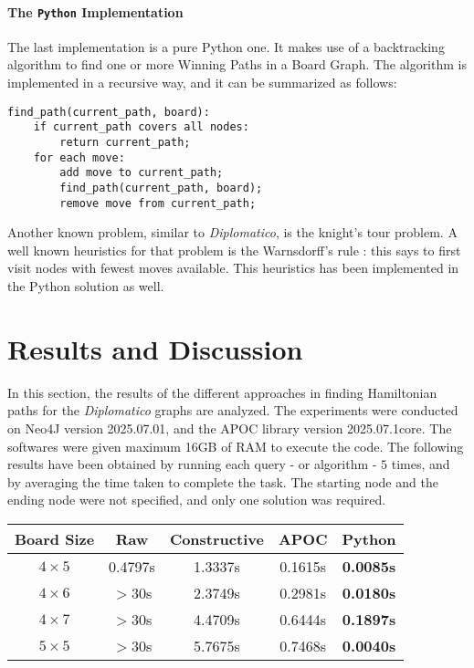 \documentclass[conference]{IEEEtran}
\begin{document}
\paragraph{The \texttt{Python} Implementation}
The last implementation is a pure Python one. It makes use of a backtracking algorithm to find one or more Winning Paths in a Board Graph.
The algorithm is implemented in a recursive way, and it can be summarized as follows:
\begin{tcolorbox}[colback=yellow!5!white, colframe=yellow!50!black]
\begin{verbatim}
find_path(current_path, board):
    if current_path covers all nodes:
        return current_path;
    for each move:
        add move to current_path;
        find_path(current_path, board);
        remove move from current_path;
\end{verbatim}
\end{tcolorbox}

Another known problem, similar to \textit{Diplomatico}, is the knight's tour problem.
A well known heuristics for that problem is the Warnsdorff's rule \cite{warnsdorff}: this says to first visit nodes with fewest moves available.
This heuristics has been implemented in the Python solution as well.

\section{Results and Discussion}

In this section, the results of the different approaches in finding Hamiltonian paths for the \textit{Diplomatico} graphs are analyzed.
The experiments were conducted on Neo4J version 2025.07.01, and the APOC library version 2025.07.1core. The softwares were given maximum 16GB of RAM to execute the code.
The following results have been obtained by running each query - or algorithm - $5$ times, and by averaging the time taken to complete the task.
The starting node and the ending node were not specified, and only one solution was required.

\begin{table}[ht]
\centering
\begin{tabular}{|c|c c c c |}
\hline
\textbf{Board Size} & \textbf{Raw} & \textbf{Constructive} & \textbf{APOC} & \textbf{Python} \\ \hline
\textbf{$4 \times 5$} & 0.4797s & 1.3337s & 0.1615s & \textbf{0.0085s}  \\ \hline
\textbf{$4 \times 6$} & $>$30s & 2.3749s & 0.2981s & \textbf{0.0180s} \\ \hline
\textbf{$4 \times 7$} & $>$30s & 4.4709s & 0.6444s & \textbf{0.1897s} \\ \hline
\textbf{$5 \times 5$} & $>$30s & 5.7675s & 0.7468s & \textbf{0.0040s} \\ \hline
\end{tabular}
\end{table}
\end{document}
